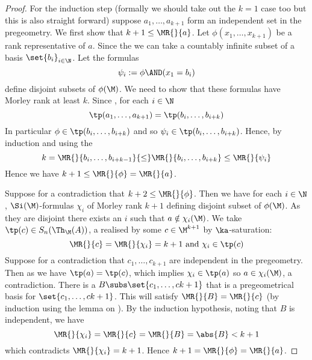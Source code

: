 \begin{proof}
    For the induction step (formally we should take out the $k=1$ case %
    too but this is also straight forward) suppose 
    $a_1,\dots,a_{k+1}$ form an independent set in the 
    pregeometry.
    We first show that $k + 1 \leq \MR{}{a}$.
    Let $\phi(x_1,\dots,x_{k+1})$ be a rank representative of $a$.
    Since the 
    we can take a countably infinite 
    subset of a basis $\set{b_i}_{i \in \N}$. 
    Let the formulas 
    \[
        \psi_i := \phi \AND (x_1 = b_i)
    \]
    define disjoint subsets of $\phi(\M)$.
    We need to show that these formulas have Morley rank at least $k$.
    Since , for each $i \in \N$ 
    \[\tp(a_1,\dots,a_{k+1}) = \tp(b_i,\dots,b_{i+k})\]
    In particular $\phi \in \tp(b_i,\dots,b_{i+k})$ and so 
    $\psi_i \in \tp(b_i,\dots,b_{i+k})$.
    Hence, by induction and using the 
    \[
        k = \MR{}{b_i,\dots,b_{i+k-1}} 
        {\leq} \MR{}{b_i,\dots,b_{i+k}}
        \leq \MR{}{\psi_i}
    \]
    Hence we have $k + 1 \leq \MR{}{\phi} = \MR{}{a}$.

    Suppose for a contradiction that $k + 2 \leq \MR{}{\phi}$.
    Then we have for each $i \in \N$, $\Si(\M)$-formulas $\chi_i$
    of Morley rank $k + 1$ defining disjoint subset of $\phi(\M)$.
    As they are disjoint there exists an $i$ such that $a \notin \chi_i(\M)$.
    We take $\tp(c) \in S_n(\Th_\M(A))$, 
    a 
    realised by some $c \in \M^{k+1}$ by $\ka$-saturation:
    \[\MR{}{c} = \MR{}{\chi_i} = k + 1 \text{ and } \chi_i \in \tp(c)\]
    Suppose for a contradiction that $c_1,\dots,c_{k+1}$ are independent in the 
    pregeometry.
    Then as  we have $\tp(a) = \tp(c)$,
    which implies $\chi_i \in \tp(a)$ so $a \in \chi_i(\M)$, a contradiction.
    There is a 
    $B \subs \set{c_1,\dots,c{k+1}}$ 
    that is a pregeometrical basis for $\set{c_1,\dots,c{k+1}}$.
    This will satisfy $\MR{}{B} = \MR{}{c}$ (by induction using the lemma on 
    ).
    By the induction hypothesis, noting that $B$ is independent, we have
    \[\MR{}{\chi_i} = \MR{}{c} = \MR{}{B} = \abs{B} < k + 1\]
    which contradicts $\MR{}{\chi_i} = k + 1$.
    Hence $k + 1 = \MR{}{\phi} = \MR{}{a}$.
\end{proof}

